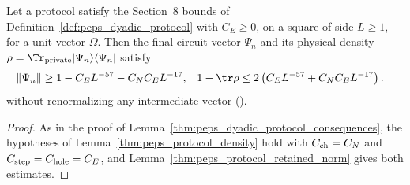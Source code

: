 \begin{lemma}
    \label{thm:peps_dyadic_protocol_retained_norm}
    \leanok
    Let a protocol satisfy the Section~8 bounds of
    Definition~\ref{def:peps_dyadic_protocol} with $C_E\ge0$, on a square of side
    $L\ge1$, for a unit vector $\Omega$. Then the final circuit vector $\Psi_n$
    and its physical density
    $\rho=\Tr_{\rm private}|\Psi_n\rangle\langle\Psi_n|$ satisfy
    \begin{align}
        \lVert\Psi_n\rVert & \ge1-C_EL^{-57}-C_NC_EL^{-17},             &
        1-\tr\rho          & \le2\left(C_EL^{-57}+C_NC_EL^{-17}\right).
    \end{align}
    without renormalizing any intermediate vector
    (\cite[Section~8.1]{OpenAI2026PolynomialPEPS}).
\end{lemma}

\begin{proof}\leanok
    As in the proof of Lemma~\ref{thm:peps_dyadic_protocol_consequences}, the
    hypotheses of Lemma~\ref{thm:peps_protocol_density} hold with
    $C_{\rm ch}=C_N$ and $C_{\rm step}=C_{\rm hole}=C_E$, and
    Lemma~\ref{thm:peps_protocol_retained_norm} gives both estimates.
\end{proof}
